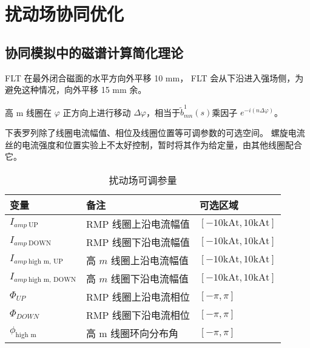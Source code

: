 \chapter{扰动场协同优化}

\section{协同模拟中的磁谱计算简化理论}
FLT 在最外闭合磁面的水平方向外平移 10 mm， FLT 会从下沿进入强场侧，为避免这种情况，向外平移 15 mm 余。


  高 m 线圈在 $\varphi$ 正方向上进行移动 $\Delta \varphi$，相当于$\tilde{b}_{m n}^{1}(s)$乘因子 $e^{-i\left(n \Delta\varphi \right )}$。

  下表罗列除了线圈电流幅值、相位及线圈位置等可调参数的可选空间。
  螺旋电流丝的电流强度和位置实验上不太好控制，暂时将其作为给定量，由其他线圈配合它。

  
\begin{table}[htb]
  \centering
  \caption{扰动场可调参量}
  \label{tab:east_parameter}
  \begin{tabularx}{\linewidth}{lXX}
      \toprule[1.5pt]
      变量 & 备注 & 可选区域 \\
      \midrule[1pt]
      $I_{amp~\text{UP}}$ & RMP 线圈上沿电流幅值 & $[-10 \text{kAt}, 10 \text{kAt}]$\\ 
      $I_{amp~\text{DOWN}}$ & RMP 线圈下沿电流幅值 & $[-10 \text{kAt}, 10 \text{kAt}]$\\ 
      $I_{amp~\text{high m, UP}}$ & 高 $m$ 线圈上沿电流幅值 & $[-10 \text{kAt}, 10 \text{kAt}]$\\
      $I_{amp~\text{high m, DOWN}}$ & 高 $m$ 线圈下沿电流幅值 & $[-10 \text{kAt}, 10 \text{kAt}]$\\
      $\Phi_{UP}$ & RMP 线圈上沿电流相位 & $[-\pi, \pi]$\\
      $\Phi_{DOWN}$ & RMP 线圈下沿电流相位 & $[-\pi, \pi]$\\
      $\phi_{\text{high m}}$ & 高 m 线圈环向分布角 & $[-\pi, \pi]$\\
      \bottomrule[1.5pt]
  \end{tabularx}
\end{table}
  
